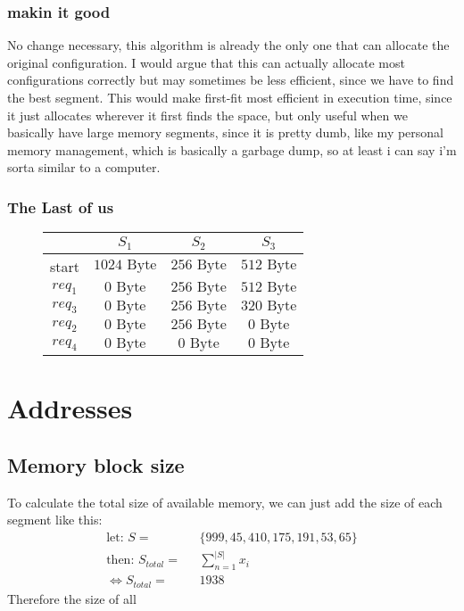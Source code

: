 \documentclass[a4paper, 11pt]{article}
\begin{document}
\subsubsection{makin it good}
No change necessary, this algorithm is already the only one that can allocate the original configuration. 
I would argue that this can actually allocate most configurations correctly but may sometimes be less efficient, since we have to find 
the best segment. This would make first-fit most efficient in execution time, since it just allocates wherever it first finds the space, 
but only useful when we basically have large memory segments, since it is pretty dumb, like my personal memory management, which is basically a garbage dump,
so at least i can say i'm sorta similar to a computer.
\newpage

\subsubsection{The Last of us}
\begin{figure}[h]
  \centering
  \begin{tabular}{|c|c|c|c|}
    \hline
    &$S_1$&$S_2$&$S_3$\\\hline
    start&$1024 \mbox{ Byte}$&$256 \mbox{ Byte}$&$512 \mbox{ Byte}$\\
    $req_1$&$0 \mbox{ Byte}$&$256 \mbox{ Byte}$&$512 \mbox{ Byte}$\\
    $req_3$&$0 \mbox{ Byte}$&$256 \mbox{ Byte}$&$320 \mbox{ Byte}$\\
    $req_2$&$0 \mbox{ Byte}$&$256 \mbox{ Byte}$&$0 \mbox{ Byte}$\\
    $req_4$&$0 \mbox{ Byte}$&$0 \mbox{ Byte}$&$0 \mbox{ Byte}$\\\hline

  \end{tabular}
\end{figure}

\section{Addresses}
\subsection{Memory block size}
To calculate the total size of available memory, we can just add the size of each segment like this:
\begin{align}
  \mbox{let: } S=&\mbox{ } \{999,45,410,175,191,53,65\}\\
  \mbox{then: } S_{total} =&\mbox{ } \sum_{n=1}^{|S|} x_i\\
  \Leftrightarrow S_{total} =&\mbox{ } 1938
\end{align}
Therefore the size of all 
\end{document}
